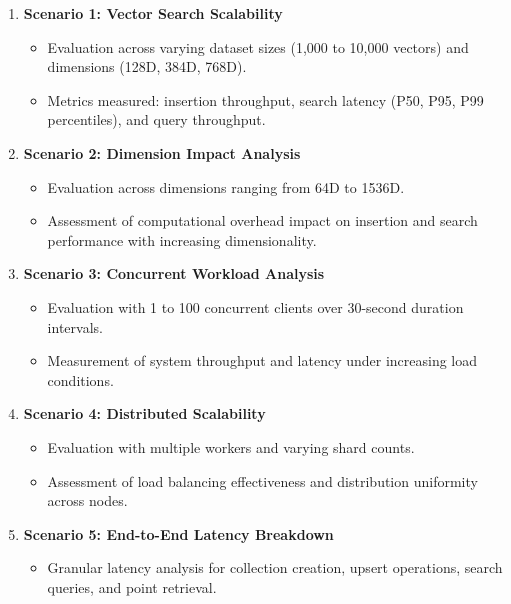 \begin{enumerate}[label=\textbf{\arabic*.}]
    \item \textbf{Scenario 1: Vector Search Scalability}
    \begin{itemize}
        \item Evaluation across varying dataset sizes (1,000 to 10,000 vectors) and dimensions (128D, 384D, 768D).
        \item Metrics measured: insertion throughput, search latency (P50, P95, P99 percentiles), and query throughput.
    \end{itemize}

    \item \textbf{Scenario 2: Dimension Impact Analysis}
    \begin{itemize}
        \item Evaluation across dimensions ranging from 64D to 1536D.
        \item Assessment of computational overhead impact on insertion and search performance with increasing dimensionality.
    \end{itemize}

    \item \textbf{Scenario 3: Concurrent Workload Analysis}
    \begin{itemize}
        \item Evaluation with 1 to 100 concurrent clients over 30-second duration intervals.
        \item Measurement of system throughput and latency under increasing load conditions.
    \end{itemize}

    \item \textbf{Scenario 4: Distributed Scalability}
    \begin{itemize}
        \item Evaluation with multiple workers and varying shard counts.
        \item Assessment of load balancing effectiveness and distribution uniformity across nodes.
    \end{itemize}

    \item \textbf{Scenario 5: End-to-End Latency Breakdown}
    \begin{itemize}
        \item Granular latency analysis for collection creation, upsert operations, search queries, and point retrieval.
    \end{itemize}


\end{enumerate}
